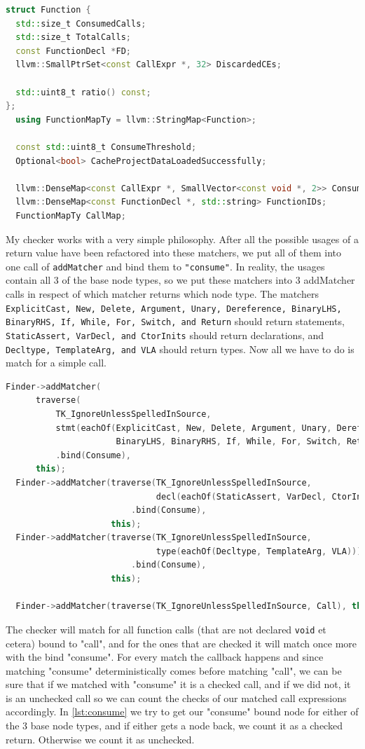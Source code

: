 \begin{lstlisting}[language={C++},caption={Members of the data structure.},label={lst:remaining members}]
struct Function {
  std::size_t ConsumedCalls;
  std::size_t TotalCalls;
  const FunctionDecl *FD;
  llvm::SmallPtrSet<const CallExpr *, 32> DiscardedCEs;
  
  std::uint8_t ratio() const;
};
  using FunctionMapTy = llvm::StringMap<Function>;

  const std::uint8_t ConsumeThreshold;
  Optional<bool> CacheProjectDataLoadedSuccessfully;

  llvm::DenseMap<const CallExpr *, SmallVector<const void *, 2>> ConsumedCalls;
  llvm::DenseMap<const FunctionDecl *, std::string> FunctionIDs;
  FunctionMapTy CallMap;
\end{lstlisting}

My checker works with a very simple philosophy. After all the possible usages of a return value have been
refactored into these matchers, we put all of them into one call of \texttt{addMatcher} and bind them to
\texttt{"consume"}. In reality, the usages contain all 3 of the base node types, so we put these matchers into 3 addMatcher calls
in respect of which matcher returns which node type. The matchers \texttt{ExplicitCast, New, Delete, Argument, Unary, Dereference,
BinaryLHS, BinaryRHS, If, While, For, Switch, and Return} should return statements, \texttt{StaticAssert, VarDecl, and CtorInits}
should return declarations, and \texttt{Decltype, TemplateArg, and VLA} should return types.
Now all we have to do is match for a simple call.

\begin{lstlisting}[language={C++},caption={Separating the matchers to statement, declaration, and type.}]
  Finder->addMatcher(
	  traverse(
		  TK_IgnoreUnlessSpelledInSource,
		  stmt(eachOf(ExplicitCast, New, Delete, Argument, Unary, Dereference,
					  BinaryLHS, BinaryRHS, If, While, For, Switch, Return)))
		  .bind(Consume),
	  this);
  Finder->addMatcher(traverse(TK_IgnoreUnlessSpelledInSource,
							  decl(eachOf(StaticAssert, VarDecl, CtorInits)))
					     .bind(Consume),
				     this);
  Finder->addMatcher(traverse(TK_IgnoreUnlessSpelledInSource,
							  type(eachOf(Decltype, TemplateArg, VLA)))
					     .bind(Consume),
				     this);

  Finder->addMatcher(traverse(TK_IgnoreUnlessSpelledInSource, Call), this);
\end{lstlisting}

The checker will match for all function calls (that are not declared \lstinline{void} et cetera) bound to "call", and for the ones
that are checked it will match once more with the bind "consume". For every match the callback happens and since matching "consume"
deterministically comes before matching "call", we can be sure that if we matched with "consume" it is a checked call, and if we did
not, it is an unchecked call so we can count the checks of our matched call expressions accordingly. In \cref{lst:consume} we try to
get our "consume" bound node for either of the 3 base node types, and if either gets a node back, we count it as a checked return.
Otherwise we count it as unchecked.

